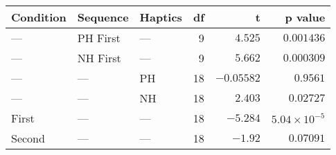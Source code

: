 \begin{tabular}{lllrrr}
\toprule
Condition &  Sequence & Haptics &  df &          t &              p value \\
\midrule
      --- &  PH First &     --- &   9 &    $4.525$ &           $0.001436$ \\
      --- &  NH First &     --- &   9 &    $5.662$ &           $0.000309$ \\
      --- &       --- &      PH &  18 & $-0.05582$ &             $0.9561$ \\
      --- &       --- &      NH &  18 &    $2.403$ &            $0.02727$ \\
    First &       --- &     --- &  18 &   $-5.284$ & $5.04\times 10^{-5}$ \\
   Second &       --- &     --- &  18 &    $-1.92$ &            $0.07091$ \\
\bottomrule
\end{tabular}
